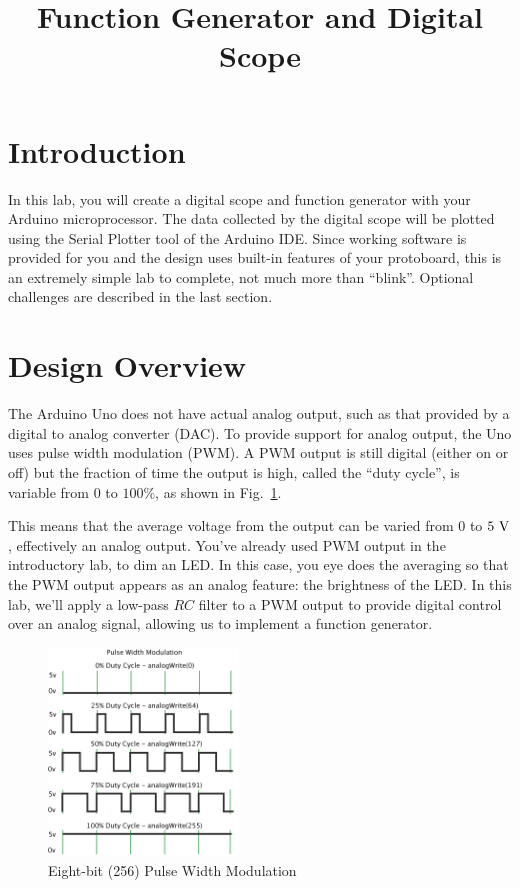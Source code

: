 \documentclass[12pt]{article}
\begin{document}

\title{Function Generator and Digital Scope} 

\maketitle

\section{Introduction}

In this lab, you will create a digital scope and function generator
with your Arduino microprocessor.  The data collected by the digital
scope will be plotted using the Serial Plotter tool of the Arduino
IDE.  Since working software is provided for you and the design uses
built-in features of your protoboard, this is an extremely simple lab
to complete, not much more than ``blink''.  Optional challenges are
described in the last section.

\section{Design Overview}

The Arduino Uno does not have actual analog output, such as that
provided by a digital to analog converter (DAC).  To provide support
for analog output, the Uno uses pulse width modulation (PWM).  A PWM
output is still digital (either on or off) but the fraction of time
the output is high, called the ``duty cycle'', is variable from $0$ to
$100\%$, as shown in Fig.~\ref{fig:pwm}.

This means that the average voltage from the output can be varied from
0 to $5~\rm V$, effectively an analog output.  You've already used PWM
output in the introductory lab, to dim an LED.  In this case, you eye
does the averaging so that the PWM output appears as an analog
feature: the brightness of the LED.  In this lab, we'll apply a
low-pass $RC$ filter to a PWM output to provide digital control over
an analog signal, allowing us to implement a function generator.

\begin{figure}[htbp]
\begin{center}
\includegraphics[width=0.45\textwidth]{figs/pwm.png}
\end{center}
\caption{Eight-bit (256) Pulse Width Modulation}
\label{fig:pwm}
\end{figure}
\end{document}

